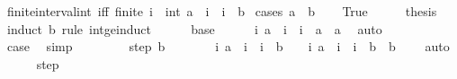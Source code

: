 \begin{isabellebody}
\isamarkupfalse%
\ finite{\isacharunderscore}{\kern0pt}interval{\isacharunderscore}{\kern0pt}int{}\ {\isacharbrackleft}{\kern0pt}iff{\isacharbrackright}{\kern0pt}{\isacharcolon}{\kern0pt}\ {\isachardoublequoteopen}finite\ {\isacharbraceleft}{\kern0pt}i\ {\isacharcolon}{\kern0pt}{\isacharcolon}{\kern0pt}\ int{\isachardot}{\kern0pt}\ a\ {\isasymle}\ i\ {\isasymand}\ i\ {\isasymle}\ b{\isacharbraceright}{\kern0pt}{\isachardoublequoteclose}\isanewline
%
\isadelimproof
%
\endisadelimproof
%
\isatagproof
{}\isamarkupfalse%
\ {\isacharparenleft}{\kern0pt}cases\ {\isachardoublequoteopen}a\ {\isasymle}\ b{\isachardoublequoteclose}{\isacharparenright}{\kern0pt}\isanewline
\ \ \isamarkupfalse%
\ True\isanewline
\ \ \isamarkupfalse%
\ \isamarkupfalse%
\ {\isacharquery}{\kern0pt}thesis\isanewline
\ \ \isamarkupfalse%
\ {\isacharparenleft}{\kern0pt}induct\ b\ rule{\isacharcolon}{\kern0pt}\ int{\isacharunderscore}{\kern0pt}ge{\isacharunderscore}{\kern0pt}induct{\isacharparenright}{\kern0pt}\isanewline
\ \ \ \ \isamarkupfalse%
\ base\isanewline
\ \ \ \ \isamarkupfalse%
\ {\isachardoublequoteopen}{\isacharbraceleft}{\kern0pt}i{\isachardot}{\kern0pt}\ a\ {\isasymle}\ i\ {\isasymand}\ i\ {\isasymle}\ a{\isacharbraceright}{\kern0pt}\ {\isacharequal}{\kern0pt}\ {\isacharbraceleft}{\kern0pt}a{\isacharbraceright}{\kern0pt}{\isachardoublequoteclose}\ \isamarkupfalse%
\ auto\isanewline
\ \ \ \ \isamarkupfalse%
\ \isamarkupfalse%
\ {\isacharquery}{\kern0pt}case\ \isamarkupfalse%
\ simp\isanewline
\ \ \isamarkupfalse%
\isanewline
\ \ \ \ \isamarkupfalse%
\ {\isacharparenleft}{\kern0pt}step\ b{\isacharparenright}{\kern0pt}\isanewline
\ \ \ \ \isamarkupfalse%
\ \isamarkupfalse%
\ {\isachardoublequoteopen}{\isacharbraceleft}{\kern0pt}i{\isachardot}{\kern0pt}\ a\ {\isasymle}\ i\ {\isasymand}\ i\ {\isasymle}\ b\ {\isacharplus}{\kern0pt}\ {}{\isacharbraceright}{\kern0pt}\ {\isacharequal}{\kern0pt}\ {\isacharbraceleft}{\kern0pt}i{\isachardot}{\kern0pt}\ a\ {\isasymle}\ i\ {\isasymand}\ i\ {\isasymle}\ b{\isacharbraceright}{\kern0pt}\ {\isasymunion}\ {\isacharbraceleft}{\kern0pt}b\ {\isacharplus}{\kern0pt}\ {}{\isacharbraceright}{\kern0pt}{\isachardoublequoteclose}\ \isamarkupfalse%
\ auto\isanewline
\ \ \ \ \isamarkupfalse%
\ step\ \isamarkupfalse%

\end{isabellebody}
